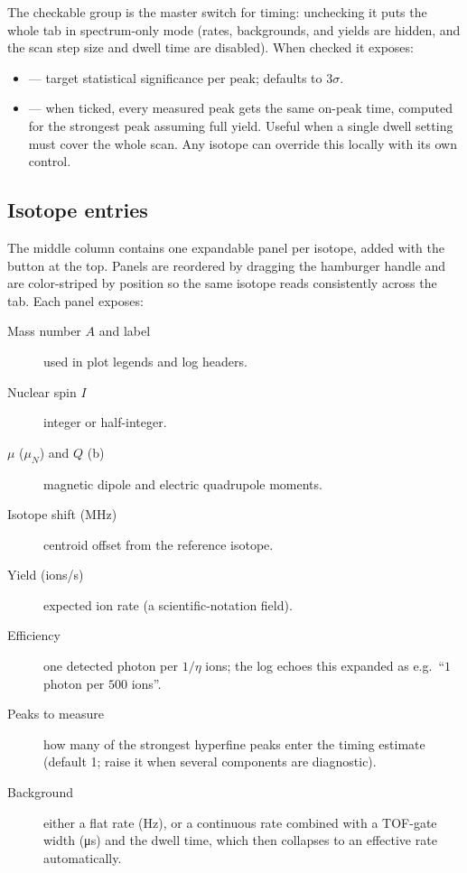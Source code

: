 The checkable  group is the master
switch for timing: unchecking it puts the whole tab in spectrum-only
mode (rates, backgrounds, and yields are hidden, and the scan step
size and dwell time are disabled). When checked it exposes:

\begin{itemize}
    \item {} --- target statistical significance per
        peak; defaults to $3\sigma$.
    \item {} --- when ticked, every
        measured peak gets the same on-peak time, computed for the
        strongest peak assuming full yield. Useful when a single dwell
        setting must cover the whole scan. Any isotope can override
        this locally with its own  control.
\end{itemize}

\subsection{Isotope entries}

The middle column contains one expandable panel per isotope, added
with the  button at the top. Panels are reordered
by dragging the hamburger handle and are color-striped by position so
the same isotope reads consistently across the tab. Each panel
exposes:

\begin{description}
    \item[Mass number $A$ and label] used in plot legends and log
        headers.
    \item[Nuclear spin $I$] integer or half-integer.
    \item[$\mu$ ($\mu_N$) and $Q$ (b)] magnetic dipole and electric
        quadrupole moments.
    \item[Isotope shift (MHz)] centroid offset from the reference
        isotope.
    \item[Yield (ions/s)] expected ion rate (a scientific-notation
        field).
    \item[Efficiency] one detected photon per
        $1/\eta$ ions; the log echoes this expanded as e.g.\
        ``$1$ photon per $500$ ions''.
    \item[Peaks to measure] how many of the strongest hyperfine peaks
        enter the timing estimate (default 1; raise it when several
        components are diagnostic).
    \item[Background] either a flat rate (Hz), or a continuous rate
        combined with a TOF-gate width (\si{\micro\second}) and the
        dwell time, which then collapses to an effective rate
        automatically.
\end{description}

